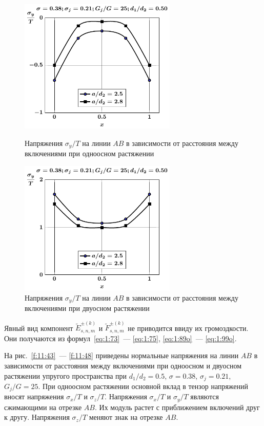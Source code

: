 \begin{figure}[h!]
\centering\footnotesize
\parbox[b]{7.5cm}{\centering\includegraphics[width=7.5cm]{periodic-oblate-inc27-a-d50-g25-t1-sig_y.pdf}
\caption{Напряжения $\sigma_y/T$ на линии $AB$ в зависимости от расстояния между включениями при одноосном растяжении
\label{f:11:45}}}\hfil\hfil
\parbox[b]{7.5cm}{\centering\includegraphics[width=7.5cm]{periodic-oblate-inc27-a-d50-g25-t2-sig_y.pdf}
\caption{Напряжения $\sigma_y/T$ на линии $AB$ в зависимости от расстояния между включениями при двуосном растяжении
\label{f:11:46}}}
\end{figure}

Явный вид компонент $\tilde E_{s,n,m}^{\pm(k)}$ и $\tilde F_{s,n,m}^{\pm(k)}$ не приводится ввиду их громоздкости. Они получаются из формул~\eqref{eq:1:73}~--- \eqref{eq:1:75}, \eqref{eq:1:89o}~--- \eqref{eq:1:99o}.

На рис.~\ref{f:11:43}~--- \ref{f:11:48} приведены нормальные напряжения на линии $AB$ в зависимости от расстояния между включениями при одноосном и двуосном растяжении упругого пространства при $d_1/d_2=0.5$, $\sigma=0.38$, $\sigma_j=0.21$, $G_j/G=25$.
При одноосном растяжении основной вклад в тензор напряжений вносят напряжения $\sigma_x/T$ и $\sigma_z/T$. Напряжения $\sigma_x/T$ и $\sigma_y/T$ являются сжимающими на отрезке $AB$. Их модуль растет с приближением включений друг к другу. Напряжения $\sigma_z/T$ меняют знак на отрезке $AB$.

